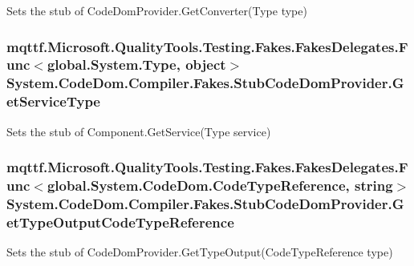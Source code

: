Sets the stub of Code\-Dom\-Provider.\-Get\-Converter(\-Type type)

\hypertarget{class_system_1_1_code_dom_1_1_compiler_1_1_fakes_1_1_stub_code_dom_provider_a185fa982ef15a4c32292b35b5979ba0f}{
\subsubsection[{Get\-Service\-Type}]{\setlength{\rightskip}{0pt plus 5cm}mqttf.\-Microsoft.\-Quality\-Tools.\-Testing.\-Fakes.\-Fakes\-Delegates.\-Func$<$global.\-System.\-Type, object$>$ System.\-Code\-Dom.\-Compiler.\-Fakes.\-Stub\-Code\-Dom\-Provider.\-Get\-Service\-Type}}\label{class_system_1_1_code_dom_1_1_compiler_1_1_fakes_1_1_stub_code_dom_provider_a185fa982ef15a4c32292b35b5979ba0f}


Sets the stub of Component.\-Get\-Service(\-Type service)

\hypertarget{class_system_1_1_code_dom_1_1_compiler_1_1_fakes_1_1_stub_code_dom_provider_a49dee1ac7eb49679f95fb24c7211ed04}{
\subsubsection[{Get\-Type\-Output\-Code\-Type\-Reference}]{\setlength{\rightskip}{0pt plus 5cm}mqttf.\-Microsoft.\-Quality\-Tools.\-Testing.\-Fakes.\-Fakes\-Delegates.\-Func$<$global.\-System.\-Code\-Dom.\-Code\-Type\-Reference, string$>$ System.\-Code\-Dom.\-Compiler.\-Fakes.\-Stub\-Code\-Dom\-Provider.\-Get\-Type\-Output\-Code\-Type\-Reference}}\label{class_system_1_1_code_dom_1_1_compiler_1_1_fakes_1_1_stub_code_dom_provider_a49dee1ac7eb49679f95fb24c7211ed04}


Sets the stub of Code\-Dom\-Provider.\-Get\-Type\-Output(\-Code\-Type\-Reference type)

